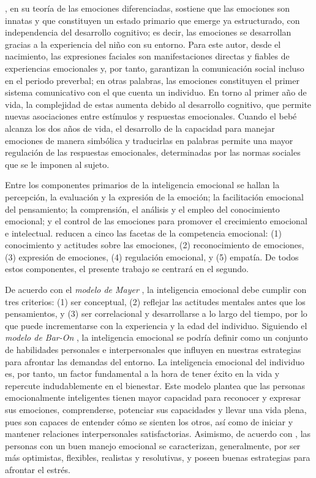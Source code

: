 \documentclass[spanish]{textolivre}
\begin{document}
\textcite{izard_il_1977}, en su teoría de las emociones diferenciadas, sostiene que las emociones son innatas y que constituyen un estado primario que emerge ya estructurado, con independencia del desarrollo cognitivo; es decir, las emociones se desarrollan gracias a la experiencia del niño con su entorno. Para este autor, desde el nacimiento, las expresiones faciales son manifestaciones directas y fiables de experiencias emocionales y, por tanto, garantizan la comunicación social incluso en el periodo preverbal; en otras palabras, las emociones constituyen el primer sistema comunicativo con el que cuenta un individuo. En torno al primer año de vida, la complejidad de estas aumenta debido al desarrollo cognitivo, que permite nuevas asociaciones entre estímulos y respuestas emocionales. Cuando el bebé alcanza los dos años de vida, el desarrollo de la capacidad para manejar emociones de manera simbólica y traducirlas en palabras permite una mayor regulación de las respuestas emocionales, determinadas por las normas sociales que se le imponen al sujeto.

Entre los componentes primarios de la inteligencia emocional se hallan la percepción, la evaluación y la expresión de la emoción; la facilitación emocional del pensamiento; la comprensión, el análisis y el empleo del conocimiento emocional; y el control de las emociones para promover el crecimiento emocional e intelectual. \textcite{grund_emotional_2023} reducen a cinco las facetas de la competencia emocional: (1) conocimiento y actitudes sobre las emociones, (2) reconocimiento de emociones, (3) expresión de emociones, (4) regulación emocional, y (5) empatía. De todos estos componentes, el presente trabajo se centrará en el segundo.

De acuerdo con el \textit{modelo de Mayer} \cite{mayer_what_1997,mayer_2000,salovey_emotional_1990}, la inteligencia emocional debe cumplir con tres criterios: (1) ser conceptual, (2) reflejar las actitudes mentales antes que los pensamientos, y (3) ser correlacional y desarrollarse a lo largo del tiempo, por lo que puede incrementarse con la experiencia y la edad del individuo. Siguiendo el \textit{modelo de Bar-On} \cite{bar-on_development_1997}, la inteligencia emocional se podría definir como un conjunto de habilidades personales e interpersonales que influyen en nuestras estrategias para afrontar las demandas del entorno. La inteligencia emocional del individuo es, por tanto, un factor fundamental a la hora de tener éxito en la vida y repercute indudablemente en el bienestar. Este modelo plantea que las personas emocionalmente inteligentes tienen mayor capacidad para reconocer y expresar sus emociones, comprenderse, potenciar sus capacidades y llevar una vida plena, pues son capaces de entender cómo se sienten los otros, así como de iniciar y mantener relaciones interpersonales satisfactorias. Asimismo, de acuerdo con \textcite{bar-on_development_1997}, las personas con un buen manejo emocional se caracterizan, generalmente, por ser más optimistas, flexibles, realistas y resolutivas, y poseen buenas estrategias para afrontar el estrés. 
\end{document}
